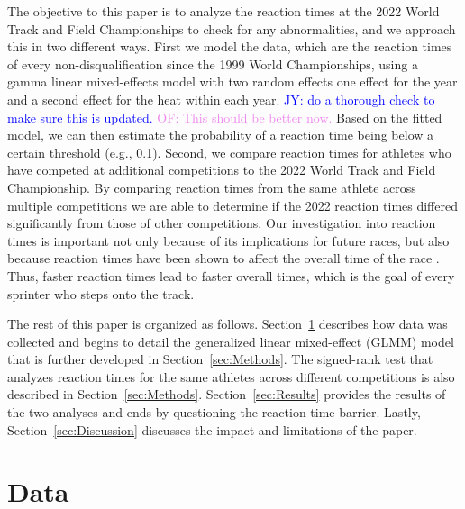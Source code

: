 \documentclass[12pt, letterpaper, titlepage]{article}
\newcommand{\jy}[1]{\textcolor{blue}{JY: #1}}
\newcommand{\of}[1]{\textcolor{violet}{OF: #1}}
\begin{document}
The objective to this paper is to analyze the reaction times at the 2022 World 
Track and Field Championships to check for any abnormalities, and we approach
this in two different ways.  First we model the data, which are
the reaction times of every non-disqualification since the 1999 World 
Championships, using a gamma linear mixed-effects model with two random effects 
one effect for the year and a second effect for the
heat within each year. \jy{do a thorough check to make sure this is updated.}
\of{This should be better now.}
Based on the fitted model, we can then estimate the probability of a reaction 
time being below a certain threshold (e.g., 0.1). 
Second, we compare reaction times for athletes who have competed
at additional competitions to the 2022 World Track and Field Championship.  By
comparing reaction times from the same athlete across multiple competitions we 
are able to determine if the 2022 reaction times differed significantly from 
those of other competitions.
Our investigation into reaction times is important not only because of its
implications for future races, but also because reaction times have
been shown to affect the overall time of the race \citep{delalija2008reaction}.
Thus, faster reaction times lead to faster overall times, which is the goal of
every sprinter who steps onto the track.


The rest of this paper is organized as follows. Section~\ref{sec:Data} describes 
how data was collected and begins to detail the generalized linear mixed-effect 
(GLMM) model that is further developed in Section~\ref{sec:Methods}. The 
signed-rank test that analyzes reaction times for the same athletes across
different competitions is
also described in Section~\ref{sec:Methods}.  Section~\ref{sec:Results}
 provides the results of the two analyses and ends 
by questioning the reaction time barrier.  Lastly, Section~\ref{sec:Discussion}
discusses the impact and limitations of the paper.


\section{Data} \label{sec:Data}
\end{document}

